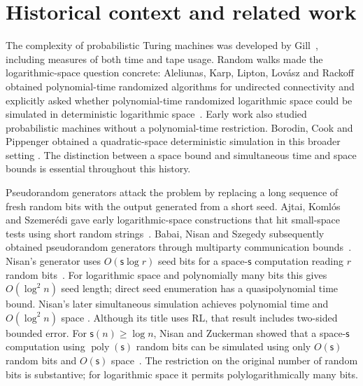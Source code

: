 \documentclass[11pt]{article}
\numberwithin{equation}{section}
\theoremstyle{definition}
\theoremstyle{remark}
\begin{document}
\section{Historical context and related work}


The complexity of probabilistic Turing machines was developed by
Gill~\cite{Gill1977}, including measures of both time and tape usage.
Random walks made the logarithmic-space question concrete:
Aleliunas, Karp, Lipton, Lov\'asz and Rackoff obtained polynomial-time
randomized algorithms for undirected connectivity and explicitly asked
whether polynomial-time randomized logarithmic space could be simulated
in deterministic logarithmic space~\cite{AleliunasKLLR1979}.
Early work also studied probabilistic machines without a polynomial-time
restriction. Borodin, Cook and Pippenger obtained a quadratic-space
deterministic simulation in this broader setting
\cite{BorodinCookPippenger1983}.
The distinction between a space bound and simultaneous time and space
bounds is essential throughout this history.

Pseudorandom generators attack the problem by replacing a long sequence
of fresh random bits with the output generated from a short seed.
Ajtai, Koml\'os and Szemer\'edi gave early logarithmic-space
constructions that hit small-space tests using short random
strings~\cite{AjtaiKomlosSzemeredi1987}. Babai, Nisan and Szegedy
subsequently obtained pseudorandom generators through multiparty
communication bounds~\cite{BabaiNisanSzegedy1992}.
Nisan's generator uses $O({\mathsf{s}}\log {r})$ seed bits for a space-${\mathsf{s}}$
computation reading ${r}$ random bits~\cite{Nisan1992}.
For logarithmic space and polynomially many bits this gives
$O(\log^2 n)$ seed length; direct seed enumeration has a
quasipolynomial time bound. Nisan's later simultaneous simulation
achieves polynomial time and $O(\log^2 n)$ space
\cite{Nisan1994RLinSC}. Although its title uses $\mathrm{RL}$,
that result includes two-sided bounded error.
For ${\mathsf{s}}(n)\ge\log n$, Nisan and Zuckerman showed that a space-${\mathsf{s}}$
computation using $\operatorname{poly}({\mathsf{s}})$ random bits can be simulated
using only $O({\mathsf{s}})$ random bits and $O({\mathsf{s}})$ space~\cite{NisanZuckerman1996}.
The restriction on the original number of random bits is substantive;
for logarithmic space it permits polylogarithmically many bits.
\end{document}
